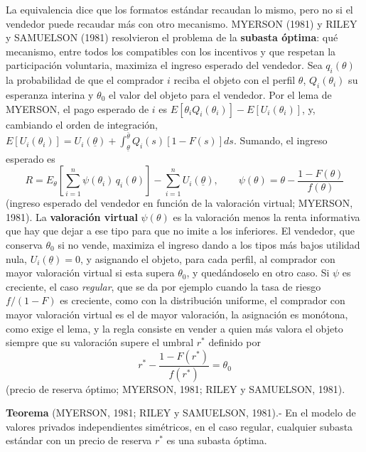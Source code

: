 \documentclass[10pt,a4paper]{article}
\begin{document}
La equivalencia dice que los formatos estándar recaudan lo mismo, pero no si el vendedor puede recaudar más con otro mecanismo. MYERSON (1981) y RILEY y SAMUELSON (1981) resolvieron el problema de la \textbf{subasta óptima}: qué mecanismo, entre todos los compatibles con los incentivos y que respetan la participación voluntaria, maximiza el ingreso esperado del vendedor. Sea $q_i(\theta)$ la probabilidad de que el comprador $i$ reciba el objeto con el perfil $\theta$, $Q_i(\theta_i)$ su esperanza interina y $\theta_0$ el valor del objeto para el vendedor. Por el lema de MYERSON, el pago esperado de $i$ es $E\left[\theta_i Q_i(\theta_i)\right]-E\left[U_i(\theta_i)\right]$, y, cambiando el orden de integración, $E\left[U_i(\theta_i)\right]=U_i(\underline{\theta})+\int_{\underline{\theta}}^{\bar{\theta}}Q_i(s)\left[1-F(s)\right]ds$. Sumando, el ingreso esperado es
$$R=E_\theta\left[\sum_{i=1}^{n}\psi(\theta_i)\,q_i(\theta)\right]-\sum_{i=1}^{n}U_i(\underline{\theta}),\qquad\psi(\theta)=\theta-\frac{1-F(\theta)}{f(\theta)}$$
(ingreso esperado del vendedor en función de la valoración virtual; MYERSON, 1981). La \textbf{valoración virtual} $\psi(\theta)$ es la valoración menos la renta informativa que hay que dejar a ese tipo para que no imite a los inferiores. El vendedor, que conserva $\theta_0$ si no vende, maximiza el ingreso dando a los tipos más bajos utilidad nula, $U_i(\underline{\theta})=0$, y asignando el objeto, para cada perfil, al comprador con mayor valoración virtual si esta supera $\theta_0$, y quedándoselo en otro caso. Si $\psi$ es creciente, el caso \textit{regular}, que se da por ejemplo cuando la tasa de riesgo $f/(1-F)$ es creciente, como con la distribución uniforme, el comprador con mayor valoración virtual es el de mayor valoración, la asignación es monótona, como exige el lema, y la regla consiste en vender a quien más valora el objeto siempre que su valoración supere el umbral $r^*$ definido por
$$r^*-\frac{1-F(r^*)}{f(r^*)}=\theta_0$$
(precio de reserva óptimo; MYERSON, 1981; RILEY y SAMUELSON, 1981).

\textbf{Teorema} (MYERSON, 1981; RILEY y SAMUELSON, 1981).- En el modelo de valores privados independientes simétricos, en el caso regular, cualquier subasta estándar con un precio de reserva $r^*$ es una subasta óptima.
\end{document}
